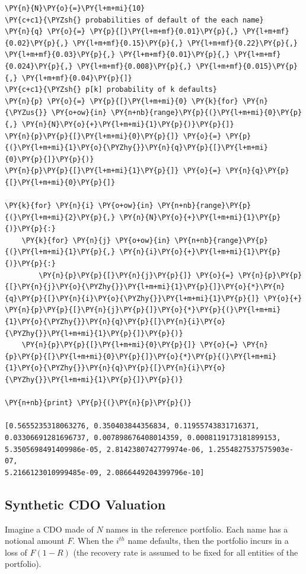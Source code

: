 \begin{tcolorbox}[breakable, size=fbox, boxrule=1pt, pad at break*=1mm,colback=cellbackground, colframe=cellborder]
\begin{Verbatim}[commandchars=\\\{\}]
\PY{n}{N}\PY{o}{=}\PY{l+m+mi}{10}
\PY{c+c1}{\PYZsh{} probabilities of default of the each name}
\PY{n}{q} \PY{o}{=} \PY{p}{[}\PY{l+m+mf}{0.01}\PY{p}{,} \PY{l+m+mf}{0.02}\PY{p}{,} \PY{l+m+mf}{0.15}\PY{p}{,} \PY{l+m+mf}{0.22}\PY{p}{,} \PY{l+m+mf}{0.03}\PY{p}{,} \PY{l+m+mf}{0.01}\PY{p}{,} \PY{l+m+mf}{0.024}\PY{p}{,} \PY{l+m+mf}{0.008}\PY{p}{,} \PY{l+m+mf}{0.015}\PY{p}{,} \PY{l+m+mf}{0.04}\PY{p}{]}
\PY{c+c1}{\PYZsh{} p[k] probability of k defaults}
\PY{n}{p} \PY{o}{=} \PY{p}{[}\PY{l+m+mi}{0} \PY{k}{for} \PY{n}{\PYZus{}} \PY{o+ow}{in} \PY{n+nb}{range}\PY{p}{(}\PY{l+m+mi}{0}\PY{p}{,} \PY{n}{N}\PY{o}{+}\PY{l+m+mi}{1}\PY{p}{)}\PY{p}{]}
\PY{n}{p}\PY{p}{[}\PY{l+m+mi}{0}\PY{p}{]} \PY{o}{=} \PY{p}{(}\PY{l+m+mi}{1}\PY{o}{\PYZhy{}}\PY{n}{q}\PY{p}{[}\PY{l+m+mi}{0}\PY{p}{]}\PY{p}{)}
\PY{n}{p}\PY{p}{[}\PY{l+m+mi}{1}\PY{p}{]} \PY{o}{=} \PY{n}{q}\PY{p}{[}\PY{l+m+mi}{0}\PY{p}{]}
		
\PY{k}{for} \PY{n}{i} \PY{o+ow}{in} \PY{n+nb}{range}\PY{p}{(}\PY{l+m+mi}{2}\PY{p}{,} \PY{n}{N}\PY{o}{+}\PY{l+m+mi}{1}\PY{p}{)}\PY{p}{:}
    \PY{k}{for} \PY{n}{j} \PY{o+ow}{in} \PY{n+nb}{range}\PY{p}{(}\PY{l+m+mi}{1}\PY{p}{,} \PY{n}{i}\PY{o}{+}\PY{l+m+mi}{1}\PY{p}{)}\PY{p}{:}
        \PY{n}{p}\PY{p}{[}\PY{n}{j}\PY{p}{]} \PY{o}{=} \PY{n}{p}\PY{p}{[}\PY{n}{j}\PY{o}{\PYZhy{}}\PY{l+m+mi}{1}\PY{p}{]}\PY{o}{*}\PY{n}{q}\PY{p}{[}\PY{n}{i}\PY{o}{\PYZhy{}}\PY{l+m+mi}{1}\PY{p}{]} \PY{o}{+} \PY{n}{p}\PY{p}{[}\PY{n}{j}\PY{p}{]}\PY{o}{*}\PY{p}{(}\PY{l+m+mi}{1}\PY{o}{\PYZhy{}}\PY{n}{q}\PY{p}{[}\PY{n}{i}\PY{o}{\PYZhy{}}\PY{l+m+mi}{1}\PY{p}{]}\PY{p}{)}
    \PY{n}{p}\PY{p}{[}\PY{l+m+mi}{0}\PY{p}{]} \PY{o}{=} \PY{n}{p}\PY{p}{[}\PY{l+m+mi}{0}\PY{p}{]}\PY{o}{*}\PY{p}{(}\PY{l+m+mi}{1}\PY{o}{\PYZhy{}}\PY{n}{q}\PY{p}{[}\PY{n}{i}\PY{o}{\PYZhy{}}\PY{l+m+mi}{1}\PY{p}{]}\PY{p}{)}
		
\PY{n+nb}{print} \PY{p}{(}\PY{n}{p}\PY{p}{)}

[0.5655235318063276, 0.350403844356834, 0.11955743831716371,
0.03306691281696737, 0.007898676408014359, 0.0008119173181899153,
5.3505698491409986e-05, 2.8142380742779974e-06, 1.2554827537575903e-07,
5.2166123010999485e-09, 2.0866449204399796e-10]
\end{Verbatim}
\end{tcolorbox}

\subsection{Synthetic CDO Valuation}
Imagine a CDO made of $N$ names in the reference portfolio. Each name has a notional amount $F$.
When the $i^{th}$ name defaults, then the portfolio incurs in a loss of $F(1-R)$ (the recovery rate is assumed to be fixed for all entities of the portfolio).

